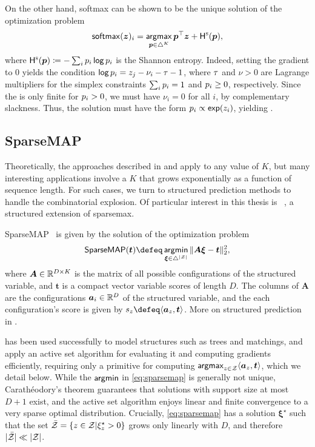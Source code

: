On the other hand, softmax can be shown to be the unique solution of the optimization problem
\begin{equation}
    \operatorname*{\mathsf{softmax}}(\bm{z})_i =
    \operatorname*{\mathsf{argmax}}_{\bm{p} \in \triangle^K} \bm{p}^\top\bm{z} + \mathsf{H}^{\textsc{s}}(\bm{p}),
\end{equation}
where $\mathsf{H}^{\textsc{s}}(\bm{p}) \coloneqq -\sum_i p_i \operatorname*{\mathsf{log}} p_i$ is the Shannon entropy.
Indeed, setting the gradient to $0$ yields the condition
$\operatorname*{\mathsf{log}} p_i = z_j - \nu_i - \tau - 1$, where $\tau$ and $\nu > 0$ are Lagrange
multipliers for the simplex constraints $\sum_i p_i = 1$ and $p_i \geq 0$,
respectively. Since the \lhs is only finite for $p_i>0$,
we must have $\nu_i=0$ for all $i$, by complementary
slackness. Thus, the solution must have the form $p_i \propto \operatorname*{\mathsf{exp}}(z_i)$, yielding .

\subsection{SparseMAP}\label{sec:smap_bg}

\noindent Theoretically, the approaches described in
 and  apply to any
value of $K$, but many interesting
applications involve a $K$ that grows exponentially as a function
of sequence length. For such cases, we turn to structured prediction
methods to handle the combinatorial explosion. Of particular interest
in this thesis is \smap~\citep{sparsemap, sparsemapcg}, a
structured extension of sparsemax.

\begin{definition}[SparseMAP]
    SparseMAP~\citep{sparsemap,
        sparsemapcg} is given by the solution of the optimization problem
    \begin{equation}\label{eq:sparsemap}
        \smapop(\bm{t}) \defeq \argmin_{\pv \in \simplex^{|\ZZ|}}
        \|\bm{A}\pv - \bm{t}\|_2^2,
    \end{equation}
    where $\bm{A}\in\mathbb{R}^{D\times K}$ is the matrix of all possible configurations
    of the structured variable, and $\bm{t}$ is a compact vector variable scores of length $D$.
    The columns of $\bm{A}$ are the configurations $\bm{a}_i \in \mathbb{R}^D$ of the structured variable,
    and the each configuration's score is given by $s_z \defeq \DP{\bm{a}_z}{\bm{t}}$.
    More on structured prediction in .
\end{definition}

\smap has been used successfully to model structures such as trees
and matchings, and \citet{sparsemap} apply an active set
algorithm for evaluating it and computing gradients efficiently,
requiring only a primitive for computing $\operatorname*{\mathsf{argmax}}_{z \in \mathcal{Z}} \langle
    \bm{a}_z, \bm{t}\rangle$, which we detail below. While the
$\operatorname*{\mathsf{argmin}}$ in \eqref{eq:sparsemap} is generally not unique,
Carath\'eodory's theorem guarantees that solutions with support size
at most $D+1$ exist, and the active set algorithm enjoys linear and
finite convergence to a very sparse optimal distribution. Crucially,
\eqref{eq:sparsemap} has a solution $\bm{\xi}^\star$ such that the
set $\bar{\mathcal{Z}} = \left\{z \in \mathcal{Z} |\xi^\star_z > 0\right\}$ grows
only linearly with $D$, and therefore $|\bar{\mathcal{Z}}| \ll |\mathcal{Z}|$.

